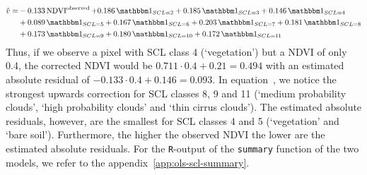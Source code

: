 	\begin{equation}\label{eq:corr_lm_res}
		\begin{aligned}		
			\hat v  = &
			-0.133 \operatorname{NDVI}^\text{observed}  
			+ 0.186 \, \mathbbm 1_{{SCL = 2}} 
			+ 0.185 \, \mathbbm 1_{{SCL = 3}} 
			+ 0.146 \, \mathbbm 1_{{SCL = 4}} \\ &
			+ 0.089 \, \mathbbm 1_{{SCL = 5}} 
			+ 0.167 \, \mathbbm 1_{{SCL = 6}} 
			+ 0.203 \, \mathbbm 1_{{SCL = 7}} 
			+ 0.181 \, \mathbbm 1_{{SCL = 8}} \\ & 
			+ 0.173 \, \mathbbm 1_{{SCL = 9}} 
			+ 0.180 \, \mathbbm 1_{{SCL = 10}} 
			+ 0.172 \, \mathbbm 1_{{SCL = 11}} 
		\end{aligned}
	\end{equation} 
	Thus, if we observe a pixel with SCL class 4 (`vegetation') but a NDVI of only 0.4, the corrected NDVI would be $0.711 \cdot 0.4 + 0.21 = 0.494$ with an estimated absolute residual of $-0.133 \cdot 0.4 + 0.146 = 0.093$.
	In equation~, we notice the strongest upwards correction for SCL classes 8, 9 and 11 (`medium probability clouds', `high probability clouds' and `thin cirrus clouds'). The estimated absolute residuals, however, are the smallest for SCL classes 4 and 5 (`vegetation' and `bare soil'). Furthermore, the higher the observed NDVI the lower are the estimated absolute residuals.
	For the \texttt{R}-output of the \texttt{summary} function of the two models, we refer to the appendix~\ref{app:ols-scl-summary}. 


	







